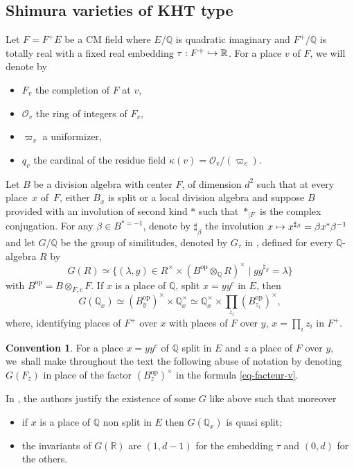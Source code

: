 \documentclass[11pt]{article}
\def\mto{\mathchoice{\longmapsto}{\mapsto}{\mapsto}{\mapsto}}
\def\hto{\mathrel{\lhook\joinrel\to}}
\let\sep\mid
\newcommand{\op}{\mathrm{op}}
\theoremstyle{plain}
\theoremstyle{definition}
\newtheorem*{convention}{Convention}
\numberwithin{equation}{subsection}
\newcommand\Qm{{\mathbb Q}}
\newcommand\Rm{{\mathbb R}}
\newcommand\OC{{\mathcal O}}
\begin{document}
\subsection{Shimura varieties of KHT type}

\label{para-geo}

Let $F=F^+ E$ be a CM field where $E/\Qm$ is quadratic imaginary and
$F^+/\Qm$ is
totally real with a fixed real embedding \hbox{$\tau:F^+ \hto \Rm$}. For a place $v$ of $F$,
we will denote by
\begin{itemize}
\item $F_v$ the completion of $F$ at $v$,

\item $\OC_v$ the ring of integers of $F_v$,

\item $\varpi_v$ a uniformizer,

\item $q_v$ the cardinal of the residue field $\kappa(v)=\OC_v/(\varpi_v)$.
\end{itemize}
Let $B$ be a division algebra with center $F$, of dimension $d^2$ such that at every place~$x$ of~$F$,
either $B_x$ is split or a local division algebra and suppose $B$ provided with an involution of
second kind $*$ such that $*_{|F}$ is the complex conjugation. For any
$\beta \in B^{*=-1}$, denote by $\sharp_\beta$ the involution $x \mto x^{\sharp_\beta}=\beta x^*
\beta^{-1}$ and let $G/\Qm$ be the group of similitudes, denoted by
$G_\tau$ in \cite{h-t}, defined for every $\Qm$-algebra $R$ by
\[
G(R) \simeq \{(\lambda,g) \in R^\times \times (B^{\op} \otimes_\Qm R)^\times \sep
gg^{\sharp_\beta}=\lambda\}
\]
with $B^{\op}=B \otimes_{F,c} F$.
If $x$ is a place of $\Qm$, split $x=yy^c$ in $E$, then
\begin{equation} \label{eq-facteur-v}
G(\Qm_x) \simeq (B_y^{\op})^\times \times \Qm_x^\times \simeq \Qm_x^\times \times
\prod_{z_i} (B_{z_i}^{\op})^\times,
\end{equation}
where, identifying places of $F^+$ over $x$ with places of $F$ over $y$,
$x=\prod_i z_i$ in $F^+$.

\begin{convention}
For a place $x=yy^c$ of $\Qm$ split in $E$ and $z$
a place of $F$ over $y$, we~shall make throughout the text the following abuse of notation by denoting
$G(F_z)$ in place of the factor $(B_z^{\op})^\times$ in the formula \eqref{eq-facteur-v}.
\end{convention}

In \cite{h-t}, the authors justify the existence of some $G$ like above such that moreover
\begin{itemize}
\item if $x$ is a place of $\Qm$ non split in $E$ then $G(\Qm_x)$ is quasi split;

\item the invariants of $G(\Rm)$ are $(1,d-1)$ for the embedding $\tau$ and $(0,d)$ for the others.
\end{itemize}
\end{document}
